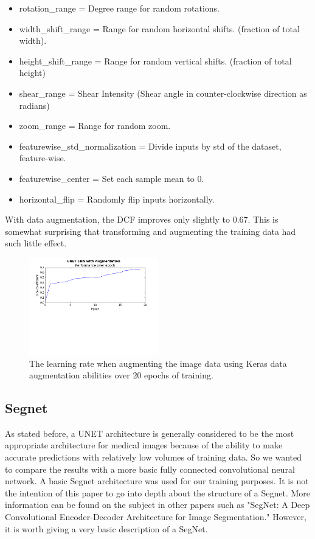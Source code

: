 \documentclass[letterpaper]{article}
\begin{document}
\begin{itemize}
  \item rotation\_range = Degree range for random rotations.
  \item width\_shift\_range =  Range for random horizontal shifts. (fraction of total width). 
  \item height\_shift\_range = Range for random vertical shifts. (fraction of total height)
  \item shear\_range = Shear Intensity (Shear angle in counter-clockwise direction as radians)
  \item zoom\_range = Range for random zoom.
  \item featurewise\_std\_normalization = Divide inputs by std of the dataset, feature-wise.
  \item featurewise\_center = Set each sample mean to 0.
  \item horizontal\_flip = Randomly flip inputs horizontally.
\end{itemize}

With data augmentation, the DCF improves only slightly to 0.67. This is somewhat surprising that transforming and augmenting the training data had such little effect.

 \begin{figure}[H]
  \centerline{\includegraphics[width=0.5\textwidth]{Plots/UNETSimple20Augmented.png}}
  \caption{The learning rate when augmenting the image data using Keras data augmentation abilities over 20 epochs of training.}
  \label{fig:unet3aug}
\end{figure}

\subsection{Segnet}
As stated before, a UNET architecture is generally considered to be the most appropriate architecture for medical images because of the ability to make accurate predictions with relatively low volumes of training data. So we wanted to compare the results with a more basic fully connected convolutional neural network. A basic Segnet architecture was used for our training purposes. It is not the intention of this paper to go into depth about the structure of a Segnet. More information can be found on the subject in other papers such as "SegNet: A Deep Convolutional Encoder-Decoder Architecture for Image Segmentation." \cite{badrinarayanan2015segnet} However, it is worth giving a very basic description of a SegNet. 
\end{document}
